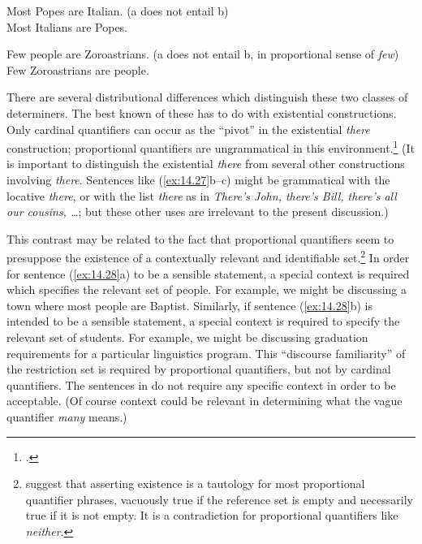 \ea \label{ex:14.25}
\ea  Most Popes are Italian.  \hfill  (a does not entail b)\\
\ex Most Italians are Popes.
\z \z

\ea \label{ex:14.26}
\ea Few people are Zoroastrians.  \hfill (a does not entail b, in proportional sense of \textit{few})\\
\ex Few Zoroastrians are people.
                       \z
\z


There are several distributional differences which distinguish these two classes of determiners. The best known of these has to do with existential constructions. Only cardinal quantifiers can occur as the “pivot” in the existential \textit{there} construction; proportional quantifiers are ungrammatical in this environment.\footnote{\citet{Milsark1977}.} (It is important to distinguish the existential \textit{there} from several other constructions involving \textit{there}. Sentences like (\ref{ex:14.27}b--c) might be grammatical with the locative \textit{there}, or with the list \textit{there} as in \textit{There’s John, there’s Bill, there’s all our cousins, …}; but these other uses are irrelevant to the present discussion.)


\ea \label{ex:14.27}
\ea {}
                       \z
\z


This contrast may be related to the fact that proportional quantifiers seem to presuppose the existence of a contextually relevant and identifiable set.\footnote{\citet{BarwiseCooper1981} suggest that asserting existence is a tautology for most proportional quantifier phrases, vacuously true if the reference set is empty and necessarily true if it is not empty. It is a contradiction for proportional quantifiers like \textit{neither}.} In order for sentence (\ref{ex:14.28}a) to be a sensible statement, a special context is required which specifies the relevant set of people. For example, we might be discussing a town where most people are Baptist. Similarly, if sentence (\ref{ex:14.28}b) is intended to be a sensible statement, a special context is required to specify the relevant set of students. For example, we might be discussing graduation requirements for a particular linguistics program. This “discourse familiarity” of the restriction set is required by proportional quantifiers, but not by cardinal quantifiers. The sentences in  do not require any specific context in order to be acceptable. (Of course context could be relevant in determining what the vague quantifier \textit{many} means.)


